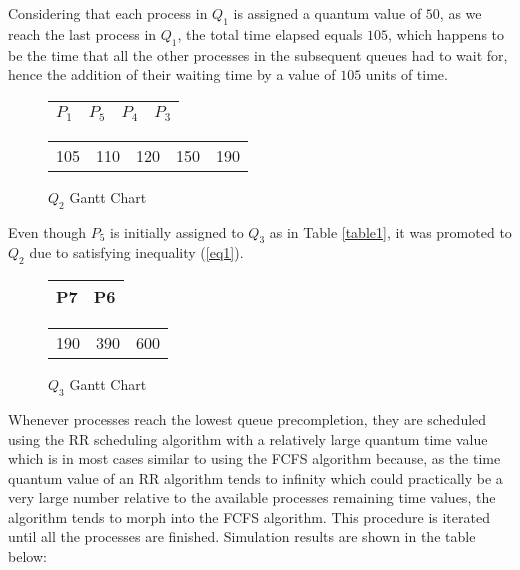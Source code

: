 \documentclass[conference]{IEEEtran}
\newcommand\T{\rule{0pt}{2.6ex}}       %
\newcommand\B{\rule[-1.2ex]{0pt}{0pt}} %
\begin{document}
Considering that each process in $Q_{1}$ is assigned a quantum value of $50$, as we reach the last process in $Q_{1}$, the total time elapsed equals $105$, which happens to be the time that all the other processes in the subsequent queues had to wait for, hence the addition of their waiting time by a value of $105$ units of time.

\begin{figure}[H]
    \begin{center}
    \begin{tabular}{|c|c|c|c|}
     \hline
        $P_{1}$ & $P_{5}$ & $P_{4}$ & $P_{3}$\T\B\\ 
     \hline
    \end{tabular}
    \end{center}
    \begin{center}
        \begin{tabular}{c c c c c}
               105 & 110 & 120 & 150 & 190\\ 
        \end{tabular}
    \end{center}
\caption{$Q_{2}$ Gantt Chart}
\end{figure}

Even though $P_{5}$ is initially assigned to $Q_{3}$ as in Table \ref{table1}, it was promoted to $Q_{2}$ due to satisfying inequality (\ref{eq1}).

\begin{figure}[H]
    \begin{center}
    \begin{tabular}{|c|c|}
     \hline
        P7 & P6\T\B\\ 
     \hline
    \end{tabular}
    \end{center}
    \begin{center}
        \begin{tabular}{c c c}
               190 & 390 & 600\\ 
        \end{tabular}
    \end{center}
\caption{$Q_{3}$ Gantt Chart}
\end{figure}

Whenever processes reach the lowest queue precompletion, they are scheduled using the RR scheduling algorithm with a relatively large quantum time value which is in most cases similar to using the FCFS algorithm because, as the time quantum value of an RR algorithm tends to infinity which could practically be a very large number relative to the available processes remaining time values, the algorithm tends to morph into the FCFS algorithm. This procedure is iterated until all the processes are finished. Simulation results are shown in the table below:
\end{document}
